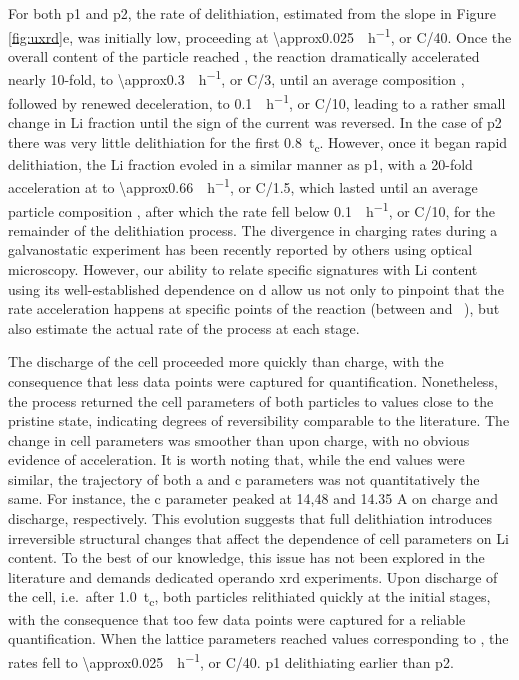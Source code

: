 \documentclass{article}
\begin{document}
For both \gls{p1} and \gls{p2}, the rate of delithiation, estimated
from the slope in Figure \ref{fig:uxrd}e, was initially low,
proceeding at \SI{\approx0.025}{\per\hour}, or C/40. Once the
overall content of the particle reached , the reaction
dramatically accelerated nearly 10-fold, to
\SI{\approx0.3}{\per\hour}, or C/3, until an average
composition , followed by renewed deceleration, to
\SI{0.1}{\per\hour}, or C/10, leading to a rather small change
in Li fraction until the sign of the current was reversed. In the case
of \gls{p2} there was very little delithiation for the first
\SI{0.8}{t_c}. However, once it began rapid delithiation, the Li
fraction evoled in a similar manner as \gls{p1}, with a 20-fold
acceleration at  to \SI{\approx0.66}{\per\hour}, or
C/1.5, which lasted until an average particle composition ,
after which the rate fell below \SI{0.1}{\per\hour}, or C/10,
for the remainder of the delithiation process. The divergence in
charging rates during a galvanostatic experiment has been recently
reported by others using optical microscopy. However, our ability to
relate specific signatures with Li content using its well-established
dependence on \gls{d} allow us not only to pinpoint that the rate
acceleration happens at specific points of the reaction (between
 and ~), but also estimate the actual rate of the
process at each stage.

The discharge of the cell proceeded more quickly than charge, with the
consequence that less data points were captured for
quantification. Nonetheless, the process returned the cell parameters
of both particles to values close to the pristine state, indicating
degrees of reversibility comparable to the
literature.\cite{robert2015} The change in cell parameters was
smoother than upon charge, with no obvious evidence of
acceleration. It is worth noting that, while the end values were
similar, the trajectory of both a and c parameters was not
quantitatively the same. For instance, the c parameter peaked at 14,48
and 14.35 A on charge and discharge, respectively. This evolution
suggests that full delithiation introduces irreversible structural
changes that affect the dependence of cell parameters on Li
content. To the best of our knowledge, this issue has not been
explored in the literature and demands dedicated operando \gls{xrd}
experiments. Upon discharge of the cell, i.e.\ after \SI{1.0}{t_c},
both particles relithiated quickly at the initial stages, with the
consequence that too few data points were captured for a reliable
quantification. When the lattice parameters reached values
corresponding to , the rates fell to
\SI{\approx0.025}{\per\hour}, or C/40.  \gls{p1} delithiating earlier than \gls{p2}.
\end{document}
